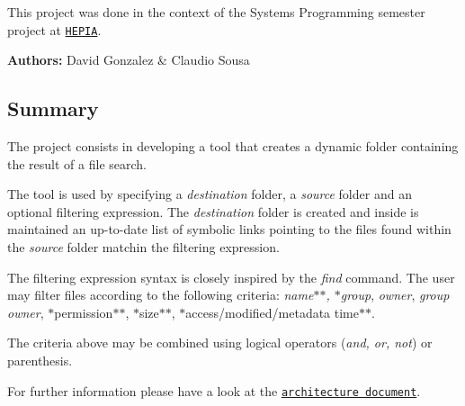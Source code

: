 This project was done in the context of the System\textquotesingle{}s Programming semester project at \href{http://hepia.hesge.ch/}{\tt H\+E\+P\+IA}.

{\bfseries Authors\+:} David Gonzalez \& Claudio Sousa

\subsection*{Summary}

The project consists in developing a tool that creates a dynamic folder containing the result of a file search.

The tool is used by specifying a {\itshape destination} folder, a {\itshape source} folder and an optional filtering expression. The {\itshape destination} folder is created and inside is maintained an up-\/to-\/date list of symbolic links pointing to the files found within the {\itshape source} folder matchin the filtering expression.

The filtering expression syntax is closely inspired by the {\itshape find} command. The user may filter files according to the following criteria\+: {\itshape name$\ast$$\ast$, $\ast$group}, {\itshape owner}, {\itshape group owner}, $\ast$permission$\ast$$\ast$, $\ast$size$\ast$$\ast$, $\ast$access/modified/metadata time$\ast$$\ast$.

The criteria above may be combined using logical operators ({\itshape and, or, not}) or parenthesis.

For further information please have a look at the \href{https://gitlab.com/hepia-projects/smart-folder/blob/master/report/SmartFolder-architecture-document.pdf}{\tt architecture document}. 